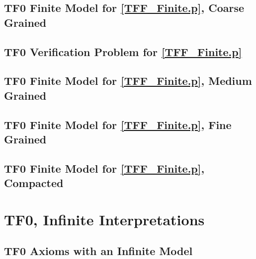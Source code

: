 \documentclass{easychair}
\begin{document}
\newpage
\subsection{TF0 Finite Model for \ref{TFF_Finite.p}, Coarse Grained}
\label{TFF_Finite.s}
\begin{small}

\end{small}

\newpage
\subsection{TF0 Verification Problem for \ref{TFF_Finite.p}}
\label{TFF_Finite.s.p}
\begin{small}

\end{small}

\newpage
\subsection{TF0 Finite Model for \ref{TFF_Finite.p}, Medium Grained}
\label{TFF_Finite_Medium.s}
\begin{small}

\end{small}

\newpage
\subsection{TF0 Finite Model for \ref{TFF_Finite.p}, Fine Grained}
\label{TFF_Finite_Fine.s}
\begin{small}

\end{small}

\newpage
\subsection{TF0 Finite Model for \ref{TFF_Finite.p}, Compacted}
\label{TFF_Finite_Compact.s}
\begin{small}

\end{small}

\newpage
\section{TF0, Infinite Interpretations}
\label{TF0Infinite}

\subsection{TF0 Axioms with an Infinite Model}
\label{TFF_Infinite.p}
\begin{small}

\end{small}
\end{document}
